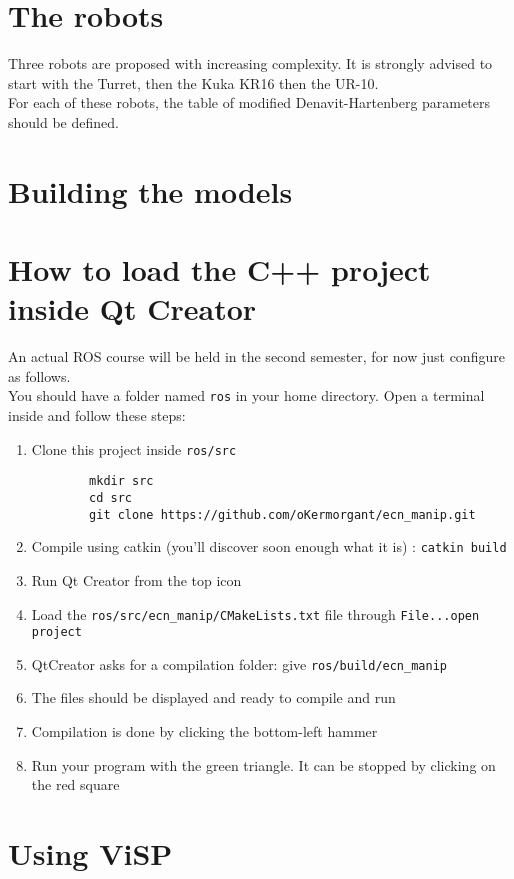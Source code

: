 \documentclass{ecnreport}
\begin{document}
\section{The robots}

Three robots are proposed with increasing complexity. It is strongly advised to start with the Turret, then the Kuka KR16 then the UR-10.\\
For each of these robots, the table of modified Denavit-Hartenberg parameters should be defined.

\section{Building the models}




\appendix


\section{How to load the C++ project inside Qt Creator}\label{ros}

An actual ROS course will be held in the second semester, for now just configure as follows.\\
You should have a folder named \texttt{ros} in your home directory. Open a terminal inside and follow these steps:
\begin{enumerate}
	\item Clone this project inside  \texttt{ros/src}
	\begin{center}\cppstyle
		\begin{lstlisting}
		mkdir src
		cd src
		git clone https://github.com/oKermorgant/ecn_manip.git
		\end{lstlisting}
	\end{center}
	\item Compile using catkin (you'll discover soon enough what it is) : \texttt{catkin build}
	\item Run Qt Creator from the top icon
	\item Load the \texttt{ros/src/ecn\_manip/CMakeLists.txt} file through \texttt{File...open project}
	\item QtCreator asks for a compilation folder: give \texttt{ros/build/ecn\_manip}
	\item The files should be displayed and ready to compile and run
	\item Compilation is done by clicking the bottom-left hammer
	\item Run your program with the green triangle. It can be stopped by clicking on the red square
	
\end{enumerate}

\section{Using ViSP}\label{visp}
\end{document}
